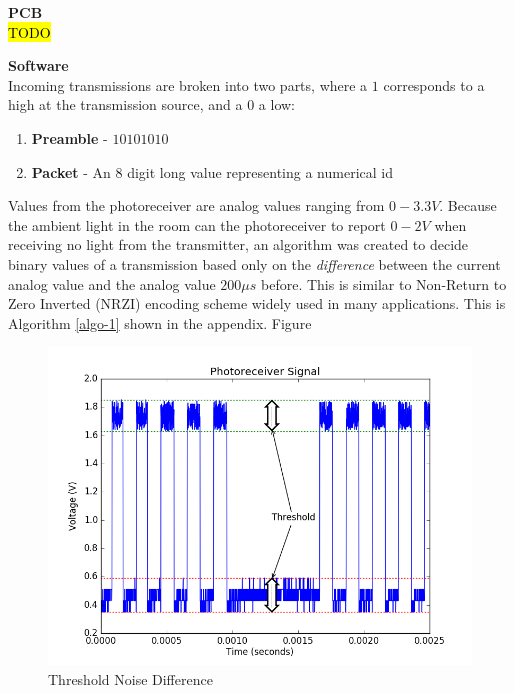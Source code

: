 \documentclass[letterpaper,10pt]{article}
\begin{document}
\begin{spacing}{1.15}
\hspace{5mm}\textbf{PCB} \label{section:target-pcb-design-details}
\\ \hl{TODO}

\hspace{5mm} \textbf{Software} \label{section:target-software-design-details}\\
Incoming transmissions are broken into two parts, where a $1$ corresponds to a high at the transmission source, and a $0$ a low: 
\begin{enumerate}
	\small
	\item \textbf{Preamble} - $10101010$ 
	\item \textbf{Packet} - An 8 digit long value representing a numerical id
\end{enumerate}


Values from the photoreceiver are analog values ranging from $0-3.3V$. Because the ambient light in the room can the photoreceiver to report $0-2V$ when receiving no light from the transmitter, an algorithm was created to decide binary values of a transmission based only on the \textit{difference} between the current analog value and the analog value $200 \mu s$ before. This is similar to Non-Return to Zero Inverted (NRZI) encoding scheme widely used in many applications. This is Algorithm \ref{algo-1} shown in the appendix. Figure 

\begin{figure} [H]
	\centering
	\includegraphics[scale=0.45]{threshold.png}
	\caption{Threshold Noise Difference\label{fig:threshold}}
\end{figure}



\end{spacing}
\end{document}
